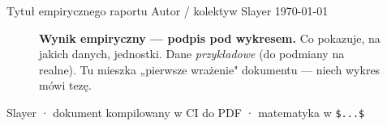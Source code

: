 \begin{titlepage}
\centering
\vspace*{1.2cm}

\slayertitle
  {Tytuł empirycznego raportu}%
  {Autor / kolektyw Slayer}%
  {\today}%

\vspace{1.4cm}

\begin{figure}[h]
  \centering
  \caption{\textbf{Wynik empiryczny --- podpis pod wykresem.} Co pokazuje, na jakich
  danych, jednostki. Dane \emph{przykładowe} (do podmiany na realne). Tu mieszka
  „pierwsze wrażenie" dokumentu --- niech wykres mówi tezę.}
  \label{fig:hero}
\end{figure}

\vfill
{\small Slayer · dokument kompilowany w CI do PDF · matematyka w \texttt{\$...\$}}
\end{titlepage}
